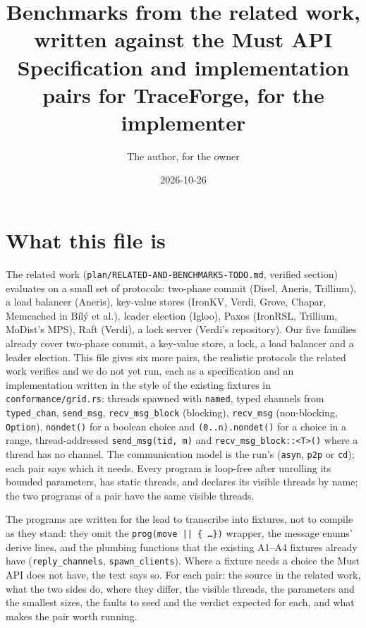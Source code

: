 \documentclass[11pt,a4paper]{article}
\title{Benchmarks from the related work, written against the Must API\\
\large Specification and implementation pairs for TraceForge, for the implementer}
\author{The author, for the owner}
\date{2026-10-26}
\newcommand{\code}[1]{\texttt{#1}}
\begin{document}
\maketitle

\section*{What this file is}

The related work (\code{plan/RELATED-AND-BENCHMARKS-TODO.md}, verified section) evaluates on a
small set of protocols: two-phase commit (Disel, Aneris, Trillium), a load balancer (Aneris),
key-value stores (IronKV, Verdi, Grove, Chapar, Memcached in B\'il\'y et al.), leader election
(Igloo), Paxos (IronRSL, Trillium, MoDist's MPS), Raft (Verdi), a lock server (Verdi's
repository). Our five families already cover two-phase commit, a key-value store, a lock, a load
balancer and a leader election. This file gives six more pairs, the realistic protocols the
related work verifies and we do not yet run, each as a specification and an implementation
written in the style of the existing fixtures in \code{conformance/grid.rs}: threads spawned
with \code{named}, typed channels from \code{typed\_chan}, \code{send\_msg},
\code{recv\_msg\_block} (blocking), \code{recv\_msg} (non-blocking, \code{Option}),
\code{nondet()} for a boolean choice and \code{(0..n).nondet()} for a choice in a range,
thread-addressed \code{send\_msg(tid, m)} and \code{recv\_msg\_block::<T>()} where a thread has
no channel. The communication model is the run's (\code{asyn}, \code{p2p} or \code{cd}); each
pair says which it needs. Every program is loop-free after unrolling its bounded parameters,
has static threads, and declares its visible threads by name; the two programs of a pair have
the same visible threads.

The programs are written for the lead to transcribe into fixtures, not to compile as they
stand: they omit the \code{prog(move || \{ \ldots \})} wrapper, the message enums'
derive lines, and the plumbing functions that the existing A1--A4 fixtures already have
(\code{reply\_channels}, \code{spawn\_clients}). Where a fixture needs a choice the Must API does
not have, the text says so. For each pair: the source in the related work, what the two sides
do, where they differ, the visible threads, the parameters and the smallest sizes, the faults to
seed and the verdict expected for each, and what makes the pair worth running.
\end{document}
